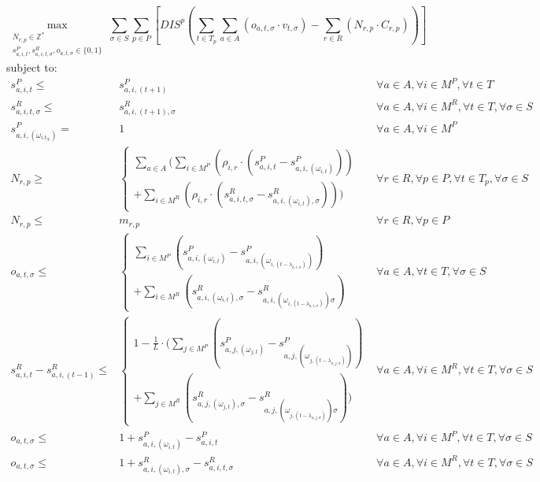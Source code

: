\documentclass[a4paper,12pt]{article}
\begin{document}
\begin{minipage}{\textwidth}
\begin{adjustwidth}{-3cm}{-2.5cm}

\begin{equation}
	\max_{\substack{N_{r,p} \in \mathbb{Z}^* \\ 
	s^P_{a,i,t}, s^R_{a,i,t,\sigma}, o_{a,t,\sigma} \in \{0, 1\}}} 
	\sum_{\sigma \in S} \sum_{p \in P} [ DIS^p (\sum_{t\in T_p} \sum_{a \in A} (o_{a,t,\sigma} \cdot v_{t,\sigma})  - \sum_{r\in R} (N_{r,p} \cdot C_{r,p})) ]
\end{equation}
subject to:
\begin{align}
s^P_{a,i,t} \leq& s^P_{a,i,(t+1)}													& \forall a \in A, \forall i \in M^P, \forall t \in T				\\
s^R_{a,i,t,\sigma} \leq& s^R_{a,i,(t+1),\sigma}											& \forall a \in A, \forall i \in M^R, \forall t \in T, \forall \sigma \in S	\\
s^P_{a,i,(\omega_{i.t_N})} =& 1													& \forall a \in A, \forall i \in M^P						\\
N_{r,p} \geq& \begin{cases} \sum_{a\in A} ( \sum_{i\in M^P} (\rho_{i,r} \cdot (s^P_{a,i,t} - s^P_{a,i,(\omega_{i,t})})) \\
+ \sum_{i \in M^R}  (\rho_{i,r} \cdot (s^R_{a,i,t,\sigma} - s^R_{a,i,(\omega_{i,t}),\sigma}))) \end{cases}		& \forall r \in R, \forall p \in P, \forall t \in T_p, \forall \sigma \in S	\\
N_{r,p} \leq& m_{r,p}															& \forall r \in R, \forall p \in P 						\\
o_{a,t,\sigma} \leq& \begin{cases}\sum_{i \in M^P} (s^P_{a,i,(\omega_{i,t})} - s^P_{a,i,(\omega_{i,(t-\lambda_{a,i,\sigma})})}) 									\\
+ \sum_{i \in M^R} (s^R_{a,i,(\omega_{i,t}),\sigma} - s^R_{a,i,(\omega_{i,(t-\lambda_{a,i,\sigma})})\sigma}) \end{cases}	
																		& \forall a \in A, \forall t \in T, \forall \sigma \in S			\\
s^R_{a,i,t} - s^R_{a,i,(t-1)} \leq& \begin{cases} 1 - \frac{1}{L} \cdot (\sum_{j \in M^P} (s^P_{a,j,(\omega_{j,t})} - s^P_{a,j,(\omega_{j,(t-\lambda_{a,j,\sigma})})}) 			\\ 
+ \sum_{j \in M^R} (s^R_{a,j,(\omega_{j,t}),\sigma} - s^R_{a,j,(\omega_{j,(t-\lambda_{a,j,\sigma})})\sigma}))\end{cases}	
																		& \forall a \in A, \forall i \in M^R, \forall t \in T, \forall \sigma \in S	\\
o_{a,t,\sigma} \leq& 1 + s^P_{a,i,(\omega_{i,t})} - s^P_{a,i,t}									& \forall a \in A, \forall i \in M^P, \forall t \in T, \forall \sigma \in S 	\\
o_{a,t,\sigma} \leq& 1 + s^R_{a,i,(\omega_{i,t}),\sigma} - s^R_{a,i,t,\sigma}							& \forall a \in A, \forall i \in M^R, \forall t \in T, \forall \sigma \in S
\end{align}

\end{adjustwidth}
\end{minipage}
\end{document}
